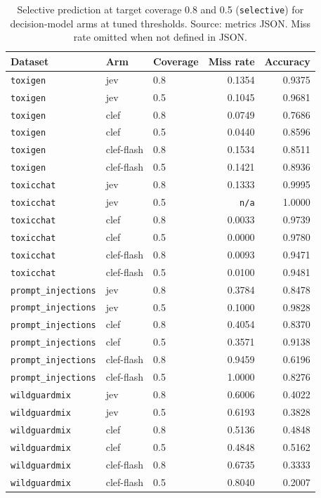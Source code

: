 \begin{table}[htbp]
\centering
\caption{Selective prediction at target coverage 0.8 and 0.5 (\texttt{selective}) for decision-model arms at tuned thresholds. Source: metrics JSON. Miss rate omitted when not defined in JSON.}
\label{tab:selective-prediction}
\footnotesize
\begin{tabular}{@{}lllrr@{}}
\toprule
Dataset & Arm & Coverage & Miss rate & Accuracy \\
\midrule
\texttt{toxigen} & jev & 0.8 & 0.1354 & 0.9375 \\
\texttt{toxigen} & jev & 0.5 & 0.1045 & 0.9681 \\
\texttt{toxigen} & clef & 0.8 & 0.0749 & 0.7686 \\
\texttt{toxigen} & clef & 0.5 & 0.0440 & 0.8596 \\
\texttt{toxigen} & clef-flash & 0.8 & 0.1534 & 0.8511 \\
\texttt{toxigen} & clef-flash & 0.5 & 0.1421 & 0.8936 \\
\texttt{toxicchat} & jev & 0.8 & 0.1333 & 0.9995 \\
\texttt{toxicchat} & jev & 0.5 & \texttt{n/a} & 1.0000 \\
\texttt{toxicchat} & clef & 0.8 & 0.0033 & 0.9739 \\
\texttt{toxicchat} & clef & 0.5 & 0.0000 & 0.9780 \\
\texttt{toxicchat} & clef-flash & 0.8 & 0.0093 & 0.9471 \\
\texttt{toxicchat} & clef-flash & 0.5 & 0.0100 & 0.9481 \\
\texttt{prompt\_injections} & jev & 0.8 & 0.3784 & 0.8478 \\
\texttt{prompt\_injections} & jev & 0.5 & 0.1000 & 0.9828 \\
\texttt{prompt\_injections} & clef & 0.8 & 0.4054 & 0.8370 \\
\texttt{prompt\_injections} & clef & 0.5 & 0.3571 & 0.9138 \\
\texttt{prompt\_injections} & clef-flash & 0.8 & 0.9459 & 0.6196 \\
\texttt{prompt\_injections} & clef-flash & 0.5 & 1.0000 & 0.8276 \\
\texttt{wildguardmix} & jev & 0.8 & 0.6006 & 0.4022 \\
\texttt{wildguardmix} & jev & 0.5 & 0.6193 & 0.3828 \\
\texttt{wildguardmix} & clef & 0.8 & 0.5136 & 0.4848 \\
\texttt{wildguardmix} & clef & 0.5 & 0.4848 & 0.5162 \\
\texttt{wildguardmix} & clef-flash & 0.8 & 0.6735 & 0.3333 \\
\texttt{wildguardmix} & clef-flash & 0.5 & 0.8040 & 0.2007 \\
\bottomrule
\end{tabular}
\end{table}

